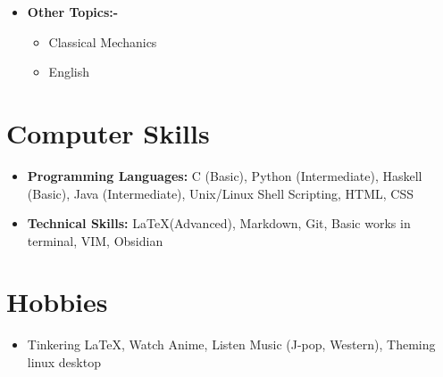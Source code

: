 \documentclass[10pt,a4paper,sans,colorlinks]{moderncv}        %
\begin{document}
\begin{itemize}
\begin{itemize}
	      \end{itemize}
	      \vspace*{5mm}
	\item \textbf{Other Topics:-}
	      \begin{itemize}
		      \item Classical Mechanics
		      \item English
	      \end{itemize}


\end{itemize}



\section{Computer Skills}

\begin{itemize}

	\item \textbf{Programming Languages:} C (Basic), Python (Intermediate), Haskell (Basic), Java (Intermediate), Unix/Linux Shell Scripting, HTML, CSS

	\item \textbf{Technical Skills:} \LaTeX (Advanced), Markdown, Git, Basic works in terminal, VIM, Obsidian


\end{itemize}
\section{Hobbies}

\begin{itemize}

	\item  Tinkering \LaTeX, Watch Anime, Listen Music (J-pop, Western), Theming linux desktop


\end{itemize}
%	


\end{document}
